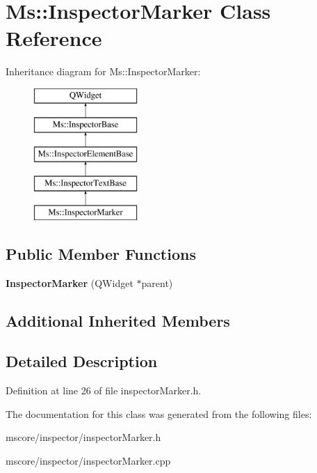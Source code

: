 \hypertarget{class_ms_1_1_inspector_marker}{}\section{Ms\+:\+:Inspector\+Marker Class Reference}
\label{class_ms_1_1_inspector_marker}
Inheritance diagram for Ms\+:\+:Inspector\+Marker\+:\begin{figure}[H]
\begin{center}
\leavevmode
\includegraphics[height=5.000000cm]{class_ms_1_1_inspector_marker}
\end{center}
\end{figure}
\subsection*{Public Member Functions}
\begin{DoxyCompactItemize}
\item 
\mbox{\label{class_ms_1_1_inspector_marker_a2d4427f250e37f80b445d8a8bf797324}} 
{\bfseries Inspector\+Marker} (Q\+Widget $\ast$parent)
\end{DoxyCompactItemize}
\subsection*{Additional Inherited Members}


\subsection{Detailed Description}


Definition at line 26 of file inspector\+Marker.\+h.



The documentation for this class was generated from the following files\+:\begin{DoxyCompactItemize}
\item 
mscore/inspector/inspector\+Marker.\+h\item 
mscore/inspector/inspector\+Marker.\+cpp\end{DoxyCompactItemize}
